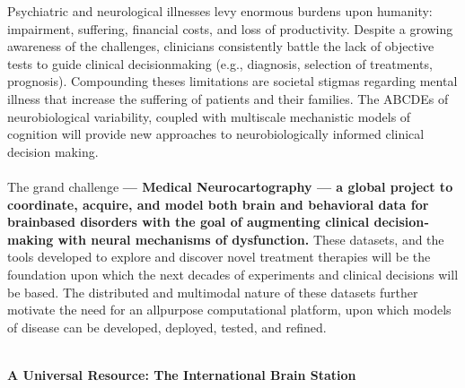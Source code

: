 \documentclass{amsart}
\begin{document}
Psychiatric and neurological illnesses levy enormous burdens upon
humanity: impairment, suffering, financial costs, and loss of
productivity. Despite a growing awareness of the challenges, clinicians
consistently battle the lack of objective tests to guide clinical
decision­making (e.g., diagnosis, selection of treatments, prognosis).
Compounding theses limitations are societal stigmas regarding mental
illness that increase the suffering of patients and their families. The
ABCDEs of neurobiological variability, coupled with multiscale
mechanistic models of cognition will provide new approaches to
neurobiologically informed clinical decision making. \\ \\ 


The grand challenge {\bf --- Medical Neurocartography --- a global project to
coordinate, acquire, and model both brain and behavioral data for
brain­based disorders with the goal of augmenting clinical
decision­making with neural mechanisms of dysfunction.}  These datasets,
and the tools developed to explore and discover novel treatment
therapies will be the foundation upon which the next decades of
experiments and clinical decisions will be based. The distributed and
multimodal nature of these datasets further motivate the need for an
all­purpose computational platform, upon which models of disease can be
developed, deployed, tested, and refined. \\ \\ 



\begin{center}
\large \bf A Universal Resource: The International Brain Station
\vspace{6pt}
\end{center}
\end{document}
